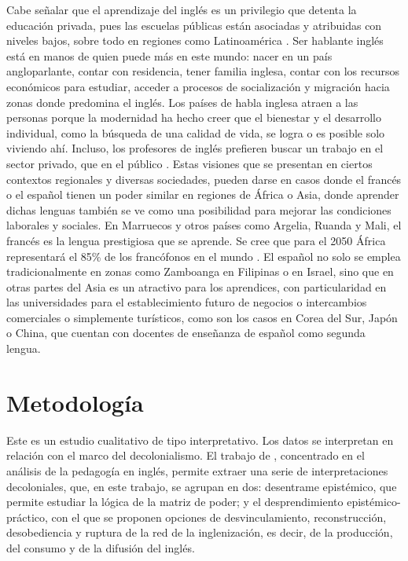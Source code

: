 \documentclass[spanish]{textolivre}
\begin{document}
Cabe señalar que el aprendizaje del inglés es un privilegio que detenta la educación privada, pues las escuelas públicas están asociadas y atribuidas con niveles bajos, sobre todo en regiones como Latinoamérica \cite{ricoy2016ensenanza}. Ser hablante inglés está en manos de quien puede más en este mundo: nacer en un país angloparlante, contar con residencia, tener familia inglesa, contar con los recursos económicos para estudiar, acceder a procesos de socialización y migración hacia zonas donde predomina el inglés. Los países de habla inglesa atraen a las personas porque la modernidad ha hecho creer que el bienestar y el desarrollo individual, como la búsqueda de una calidad de vida, se logra o es posible solo viviendo ahí. Incluso, los profesores de inglés prefieren buscar un trabajo en el sector privado, que en el público \cite{huaman_rosales_causas_2021}. Estas visiones que se presentan en ciertos contextos regionales y diversas sociedades, pueden darse en casos donde el francés o el español tienen un poder similar en regiones de África o Asia, donde aprender dichas lenguas también se ve como una posibilidad para mejorar las condiciones laborales y sociales. En Marruecos y otros países como Argelia, Ruanda y Mali, el francés es la lengua prestigiosa que se aprende. Se cree que para el 2050 África representará el 85\% de los francófonos en el mundo \cite{rfielfuturo}. El español no solo se emplea tradicionalmente en zonas como Zamboanga en Filipinas o en Israel, sino que en otras partes del Asia es un atractivo para los aprendices, con particularidad en las universidades para el establecimiento futuro de negocios o intercambios comerciales o simplemente turísticos, como son los casos en Corea del Sur, Japón o China, que cuentan con docentes de enseñanza de español como segunda lengua.
 


\section{Metodología}
Este es un estudio cualitativo de tipo interpretativo. Los datos se interpretan en relación con el marco del decolonialismo. El trabajo de \textcite{baum2019decir}, concentrado en el análisis de la pedagogía en inglés, permite extraer una serie de interpretaciones decoloniales, que, en este trabajo, se agrupan en dos: desentrame epistémico, que permite estudiar la lógica de la matriz de poder; y el desprendimiento epistémico-práctico, con el que se proponen opciones de desvinculamiento, reconstrucción, desobediencia y ruptura de la red de la inglenización, es decir, de la producción, del consumo y de la difusión del inglés.
\end{document}
